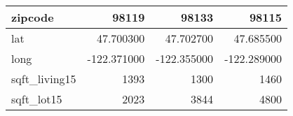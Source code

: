 \begin{table}[H]
\begin{tabular}{|l|r|r|r|}
\hline zipcode & \cellcolor[rgb]{0.9, 0.54, 0.52} 98119 & 98133 & 98115 \\
\hline lat & \cellcolor[rgb]{0.9, 0.54, 0.52} 47.700300 & 47.702700 & 47.685500 \\
\hline long & \cellcolor[rgb]{0.9, 0.54, 0.52} -122.371000 & \cellcolor[rgb]{0.9, 0.54, 0.52} -122.355000 & \cellcolor[rgb]{0.9, 0.54, 0.52} -122.289000 \\
\hline sqft\_living15 & \cellcolor[rgb]{0.9, 0.54, 0.52} 1393 & 1300 & 1460 \\
\hline sqft\_lot15 & \cellcolor[rgb]{0.9, 0.54, 0.52} 2023 & 3844 & 4800 \\
\hline
\end{tabular}
\end{table}

